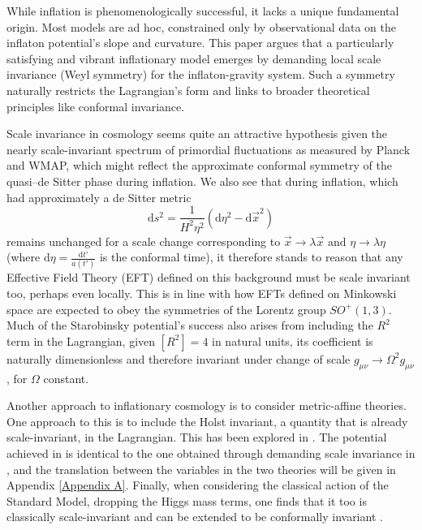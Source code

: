 \documentclass[aps,prd,reprint,preprintnumbers,showpacs,floatfix,nofootinbib,superscript address]{revtex4-2}
\begin{document}
While inflation is phenomenologically successful, it lacks a unique fundamental origin. Most models are ad hoc, constrained only by observational data on the inflaton potential’s slope and curvature. This paper argues that a particularly satisfying and vibrant inflationary model emerges by demanding local scale invariance (Weyl symmetry) for the inflaton-gravity system. Such a symmetry naturally restricts the Lagrangian’s form and links to broader theoretical principles like conformal invariance.

Scale invariance in cosmology seems quite an attractive hypothesis given the nearly scale-invariant spectrum of primordial fluctuations as measured by Planck and WMAP, which might reflect the approximate conformal symmetry of the quasi–de Sitter phase during inflation. We also see that during inflation, which had approximately a de Sitter metric
\begin{equation} \label{deSitter Conformal}
    \text{d}s^2 = \frac{1}{H^2\eta^2}(\text{d}\eta^2 - \text{d}\Vec{x}^2)
\end{equation} 
remains unchanged for a scale change corresponding to $\Vec{x} \rightarrow \lambda \Vec{x} \,\, \text{and} \,\, \eta \rightarrow \lambda \eta$ (where $\text{d}\eta =  \frac{\text{d}t'}{a(t')}$ is the conformal time), it therefore stands to reason that any Effective Field Theory (EFT) defined on this background must be scale invariant too, perhaps even locally. This is in line with how EFTs defined on Minkowski space are expected to obey the symmetries of the Lorentz group $SO^+(1,3)$. Much of the Starobinsky potential's success also arises from including the $R^2$ term in the Lagrangian, given $[R^2] = 4$ in natural units, its coefficient is naturally dimensionless and therefore invariant under change of scale $g_{\mu\nu} \rightarrow \Omega^2 g_{\mu\nu}$, for $\Omega$ constant.

Another approach to inflationary cosmology is to consider metric-affine theories. One approach to this is to include the Holst invariant, a quantity that is already scale-invariant, in the Lagrangian. This has been explored in \cite{Salvio_2022, pradisi2022equivalence}. The potential achieved in \cite{Salvio_2022} is identical to the one obtained through demanding scale invariance in \cite{barker2024poincaregaugetheoryconformal}, and the translation between the variables in the two theories will be given in Appendix \ref{Appendix A}. Finally, when considering the classical action of the Standard Model, dropping the Higgs mass terms, one finds that it too is classically scale-invariant and can be extended to be conformally invariant \cite{bardeen1995naturalness, bars2014local}.
\end{document}
